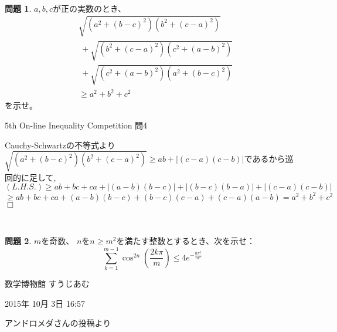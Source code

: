 \documentclass[uplatex, a5paper]{jsarticle}
\makeatletter
\theoremstyle{definition}
\newtheorem{prob}{問題}
\renewenvironment{proof}[1][\proofname]{
  \pushQED{\qed}%
  \normalfont \topsep6\p@\@plus6\p@\relax
  \trivlist
  \item[\hskip\labelsep
    #1\@addpunct{\textbf{.}}]\ignorespaces
}{%
  \popQED\endtrivlist\@endpefalse
}
\providecommand{\proofname}{証明}
\def\qed{\hfill $\Box$}
\makeatother
\begin{document}
\




\newpage


\begin{prob}
  \(a,b,c\)が正の実数のとき、
  \begin{align*}
    &\sqrt{(a^2+(b-c)^2)(b^2+(c-a)^2)}  \\
    &\ + \sqrt{(b^2+(c-a)^2)(c^2+(a-b)^2)}  \\
    &\ + \sqrt{(c^2+(a-b)^2)(a^2+(b-c)^2)} \\
    &\geq a^2+b^2+c^2
  \end{align*}
  を示せ。
  \begin{flushright}
    5th On-line Inequality Competition 問4
  \end{flushright}
\end{prob}


\begin{proof}
Cauchy-Schwartzの不等式より$\sqrt{(a^2+(b-c)^2)(b^2+(c-a)^2)} \geq ab +|(c-a)(c-b)|$であるから巡回的に足して,
$$
(L.H.S.) \geq ab+bc+ca +|(a-b)(b-c)|+|(b-c)(b-a)|+|(c-a)(c-b)| $$
$$
\geq ab+bc+ca+(a-b)(b-c)+(b-c)(c-a)+(c-a)(a-b)=a^2+b^2+c^2
$$
\qed
\end{proof}



\







\newpage


\begin{prob}
  \(m\)を奇数、
  \(n\)を\(n\geq m^2\)を満たす整数とするとき、次を示せ：
  \[
  \sum _{k=1}^{m-1} \cos ^{2n}\left( \frac{2k\pi}{m} \right) \leq 4e^{-\frac{n\pi ^2}{m^2}}
  \]

  \begin{flushright}
    数学博物館 すうじあむ

    2015年 10月 3日 16:57

    アンドロメダさんの投稿より
  \end{flushright}
\end{prob}
\end{document}
